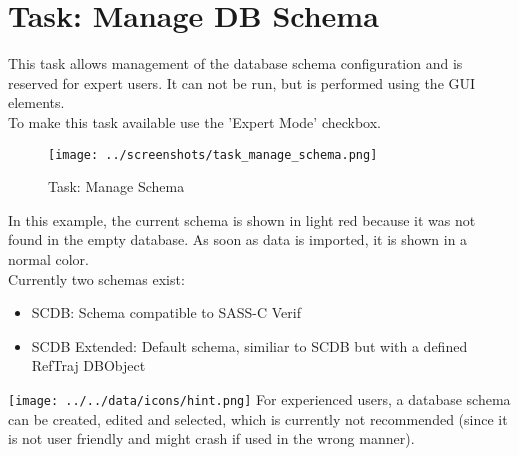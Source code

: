 \section{Task: Manage DB Schema}
\label{sec:task_manage_db_schema}

This task allows management of the database schema configuration and is reserved for expert users. It can not be run, but is performed using the GUI elements. \\

To make this task available use the 'Expert Mode' checkbox.

\begin{figure}[H]
  \hspace*{-2.5cm}
    \texttt{[image: ../screenshots/task\_manage\_schema.png]}
  \caption{Task: Manage Schema}
\end{figure}

In this example, the current schema is shown in light red because it was not found in the empty database. As soon as data is imported, it is shown in a normal color. \\

Currently two schemas exist:
\begin{itemize}  
\item SCDB: Schema compatible to SASS-C Verif
\item SCDB Extended: Default schema, similiar to SCDB but with a defined RefTraj DBObject
\end{itemize} 

\texttt{[image: ../../data/icons/hint.png]} For experienced users, a database schema can be created, edited and selected, which is currently not recommended (since it is not user friendly and might crash if used in the wrong manner).
